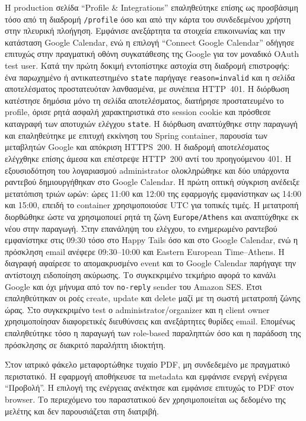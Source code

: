 Η production σελίδα \enquote{Profile \& Integrations} επαληθεύτηκε επίσης
ως προσβάσιμη τόσο από τη διαδρομή \texttt{/profile} όσο και από την κάρτα
του συνδεδεμένου χρήστη στην πλευρική πλοήγηση. Εμφάνισε ανεξάρτητα τα
στοιχεία επικοινωνίας και την κατάσταση Google Calendar, ενώ η επιλογή
\enquote{Connect Google Calendar} οδήγησε επιτυχώς στην πραγματική οθόνη
συγκατάθεσης της Google για τον μοναδικό OAuth test user. Κατά την πρώτη
δοκιμή εντοπίστηκε αστοχία στη διαδρομή επιστροφής: ένα παρωχημένο ή
αντικατεστημένο \texttt{state} παρήγαγε \texttt{reason=invalid} και η σελίδα
αποτελέσματος προστατευόταν λανθασμένα, με συνέπεια HTTP~401. Η διόρθωση
κατέστησε δημόσια μόνο τη σελίδα αποτελέσματος, διατήρησε προστατευμένο το
profile, όρισε ρητά ασφαλή χαρακτηριστικά στο session cookie και πρόσθεσε
καταγραφή των αποτυχιών ελέγχου \texttt{state}. Η διόρθωση αναπτύχθηκε στην
παραγωγή και επαληθεύτηκε με επιτυχή εκκίνηση του Spring container, παρουσία
των μεταβλητών Google και απόκριση HTTPS~200. Η διαδρομή αποτελέσματος
ελέγχθηκε επίσης άμεσα και επέστρεψε HTTP~200 αντί του προηγούμενου 401. Η
εξουσιοδότηση του λογαριασμού administrator ολοκληρώθηκε και δύο υπάρχοντα
ραντεβού δημιουργήθηκαν στο Google Calendar. Η πρώτη οπτική σύγκριση ανέδειξε
μετατόπιση τριών ωρών: ώρες 11:00 και 12:00 της εφαρμογής εμφανίστηκαν ως
14:00 και 15:00, επειδή το container χρησιμοποιούσε UTC για τοπικές τιμές.
Η μετατροπή διορθώθηκε ώστε να χρησιμοποιεί ρητά τη ζώνη
\texttt{Europe/Athens} και αναπτύχθηκε εκ νέου στην παραγωγή. Στην επανάληψη
του ελέγχου, το ενημερωμένο ραντεβού εμφανίστηκε στις 09:30 τόσο στο Happy
Tails όσο και στο Google Calendar, ενώ η πρόσκληση email ανέφερε 09:30--10:00
και Eastern European Time--Athens. Η διαγραφή αφαίρεσε το απομακρυσμένο event
και το Google Calendar παρήγαγε την αντίστοιχη ειδοποίηση ακύρωσης. Το
συγκεκριμένο τεκμήριο αφορά το κανάλι Google και όχι μήνυμα από τον
\texttt{no-reply} sender του Amazon SES. Έτσι επαληθεύτηκαν οι ροές create, update
και delete μαζί με τη σωστή μετατροπή ζώνης ώρας.
Στο συγκεκριμένο test ο administrator/organizer και η client owner
χρησιμοποίησαν διαφορετικές διευθύνσεις και ανεξάρτητες θυρίδες email.
Επομένως επαληθεύτηκε τόσο η παραγωγή των role-based παραληπτών όσο και η
παράδοση της πρόσκλησης σε διακριτό παραλήπτη ιδιοκτήτη.

Στον ιατρικό φάκελο μεταφορτώθηκε τυχαίο PDF, μη συνδεδεμένο με πραγματικό
περιστατικό. Η εφαρμογή αποθήκευσε τα metadata και εμφάνισε ενεργή ενέργεια
\enquote{Προβολή}. Η επιλογή της ενέργειας ανέκτησε και εμφάνισε επιτυχώς το
PDF στον browser. Το περιεχόμενο του παραστατικού δεν χρησιμοποιείται ως
δεδομένο της μελέτης και δεν παρουσιάζεται στη διατριβή.

